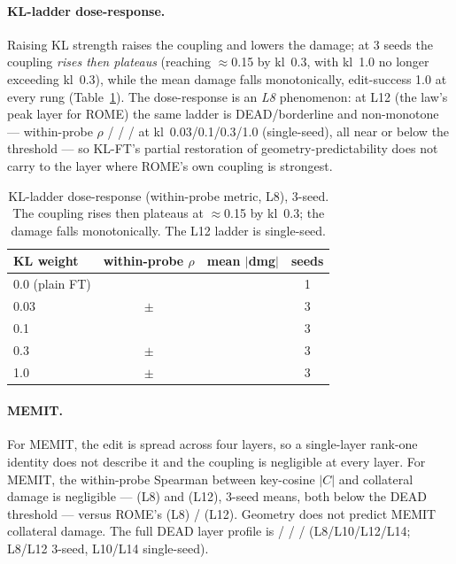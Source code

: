 \paragraph{KL-ladder dose-response.} Raising KL strength raises the coupling
and lowers the damage; at 3 seeds the coupling \emph{rises then plateaus}
(reaching $\approx$0.15 by kl~0.3, with kl~1.0 no longer exceeding kl~0.3),
while the mean damage falls monotonically, edit-success 1.0 at every rung
(Table~\ref{tab:klladder}). The dose-response is an \emph{L8} phenomenon: at
L12 (the law's peak layer for ROME) the same ladder is DEAD/borderline and
non-monotone --- within-probe $\rho$ \klLtwelveZeroThree{} / \klLtwelveOne{} /
\klLtwelveThree{} / \klLtwelveFull{} at kl~0.03/0.1/0.3/1.0 (single-seed), all
near or below the \deadThresh{} threshold --- so KL-FT's partial restoration of
geometry-predictability does not carry to the layer where ROME's own coupling
is strongest.

\begin{table}[t]
\centering\small
\setlength{\tabcolsep}{4pt}
\begin{tabular}{@{}lccc@{}}
\toprule
KL weight & within-probe $\rho$ & mean $|$dmg$|$ & seeds \\
\midrule
0.0 (plain FT) & \klZeroRho{}  & \klZeroDmg{}  & 1 \\
0.03 & \klZeroThreeRho{}\,$\pm$\,\klZeroThreeRhoSD{} & \klZeroThreeDmg{} & 3 \\
0.1  & \klOneRho{}   & \klOneDmg{}  & 3 \\
0.3  & \klThreeRho{}\,$\pm$\,\klThreeRhoSD{} & \klThreeDmg{} & 3 \\
1.0  & \klFullRho{}\,$\pm$\,\klFullRhoSD{} & \klFullDmg{} & 3 \\
\bottomrule
\end{tabular}
\caption{KL-ladder dose-response (within-probe metric, L8), 3-seed. The
coupling rises then plateaus at $\approx$0.15 by kl~0.3; the damage falls
monotonically. The L12 ladder is single-seed.}
\label{tab:klladder}
\end{table}

\paragraph{MEMIT.} For MEMIT, the edit is spread across four layers, so a
single-layer rank-one identity does not describe it and the coupling is
negligible at every layer.
For MEMIT, the within-probe Spearman between key-cosine $|C|$ and collateral
damage is negligible --- \memitRhoLeight{} (L8) and \memitRhoLtwelve{} (L12),
3-seed means, both below the \deadThresh{} DEAD threshold --- versus ROME's
\romeCmpLeight{} (L8) / \romeCmpLtwelve{} (L12). Geometry does not predict
MEMIT collateral damage. The full DEAD layer profile is \rhoC{}
\memitRhoLeight{} / \memitRhoLten{} / \memitRhoLtwelve{} / \memitRhoLfourteen{}
(L8/L10/L12/L14; L8/L12 3-seed, L10/L14 single-seed).

